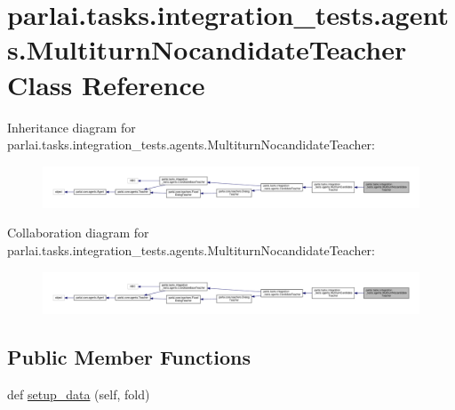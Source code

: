 \hypertarget{classparlai_1_1tasks_1_1integration__tests_1_1agents_1_1MultiturnNocandidateTeacher}{}\section{parlai.\+tasks.\+integration\+\_\+tests.\+agents.\+Multiturn\+Nocandidate\+Teacher Class Reference}
\label{classparlai_1_1tasks_1_1integration__tests_1_1agents_1_1MultiturnNocandidateTeacher}


Inheritance diagram for parlai.\+tasks.\+integration\+\_\+tests.\+agents.\+Multiturn\+Nocandidate\+Teacher\+:\nopagebreak
\begin{figure}[H]
\begin{center}
\leavevmode
\includegraphics[width=350pt]{da/d08/classparlai_1_1tasks_1_1integration__tests_1_1agents_1_1MultiturnNocandidateTeacher__inherit__graph}
\end{center}
\end{figure}


Collaboration diagram for parlai.\+tasks.\+integration\+\_\+tests.\+agents.\+Multiturn\+Nocandidate\+Teacher\+:\nopagebreak
\begin{figure}[H]
\begin{center}
\leavevmode
\includegraphics[width=350pt]{da/d88/classparlai_1_1tasks_1_1integration__tests_1_1agents_1_1MultiturnNocandidateTeacher__coll__graph}
\end{center}
\end{figure}
\subsection*{Public Member Functions}
\begin{DoxyCompactItemize}
\item 
def \hyperlink{classparlai_1_1tasks_1_1integration__tests_1_1agents_1_1MultiturnNocandidateTeacher_ac786d0ae36e1d445d68a076b8d1b8391}{setup\+\_\+data} (self, fold)
\end{DoxyCompactItemize}
